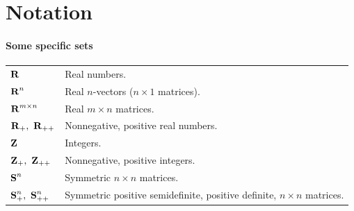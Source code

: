 \chapter*{Notation}

\subsubsection*{Some specific sets}
\begin{longtable}{p{}p{}}
    ${\bf R{}}$ & Real numbers.\\
    ${\bf R{}}^n$ & Real $n$-vectors ($n \times 1$ matrices).\\
    ${\bf R{}}^{m \times n}$ & Real $m \times n$ matrices.\\
    $\reals_+,\ \reals_{++}$ & Nonnegative, positive real numbers.\\
    ${\bf Z{}}$ & Integers.\\
    $\ints_+,\ \ints_{++}$ & Nonnegative, positive integers.\\
    ${\bf S{}}^n$ & Symmetric $n \times n$ matrices.\\
    $\symms^n_+,\ \symms^n_{++}$ & Symmetric positive semidefinite, positive definite, $n \times n$ matrices.\\
\end{longtable}

